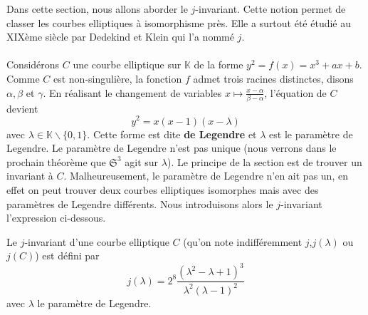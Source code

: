 \documentclass[a4paper]{article}
\begin{document}
\noindent Dans cette section, nous allons aborder le $j$-invariant.
Cette notion permet de classer les courbes elliptiques à isomorphisme près. Elle a surtout été étudié au XIXème siècle par Dedekind et Klein qui l'a nommé $j$.
\\ \\
Considérons $C$ une courbe elliptique sur $\mathbb{K}$ de la forme $y^2=f(x)=x^3+ax+b$. Comme $C$ est non-singulière, la fonction $f$ admet trois racines distinctes, disons $\alpha,\beta$ et 
$\gamma$.
En réalisant le changement de variables $x \mapsto \frac{x-\alpha}{\beta-\alpha}$, l'équation de $C$ devient
\begin{equation*}
y^2=x(x-1)(x-\lambda)
\end{equation*}
avec $\lambda \in \mathbb{K}\backslash \{0,1\}$.
Cette forme est dite \textbf{de Legendre} et $\lambda$ est le paramètre de Legendre. Le paramètre de Legendre n'est pas unique (nous verrons dans le prochain théorème que $\mathfrak{S}^3$ agit sur $\lambda$).
Le principe de la section est de trouver un invariant à $C$. Malheureusement, le paramètre de Legendre n'en ait pas un, en effet on peut trouver deux courbes elliptiques isomorphes mais avec des paramètres de Legendre différents. Nous introduisons alors le $j$-invariant l'expression ci-dessous.

\begin{definition}
Le $j$-invariant d'une courbe elliptique $C$ (qu'on note indifféremment $j$,$j(\lambda)$ ou $j(C)$)
 est défini par
\begin{equation*}
j(\lambda)=2^8 \frac{(\lambda^2-\lambda+1)^3}{\lambda^2(\lambda-1)^2}
\end{equation*}
avec $\lambda$ le paramètre de Legendre.
\end{definition}
\end{document}
